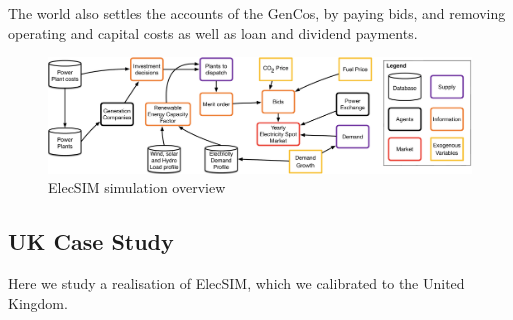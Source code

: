
The world also settles the accounts of the GenCos, by paying bids, and removing operating and capital costs as well as loan and dividend payments.

\begin{figure}
	\centering
	\includegraphics[width=0.97\linewidth]{figures/low_level_system}
	\caption{ElecSIM simulation overview}
	\label{fig:lowlevelsystem}
\end{figure}









\subsection{UK Case Study}

Here we study a realisation of ElecSIM, which we calibrated to the United Kingdom.


